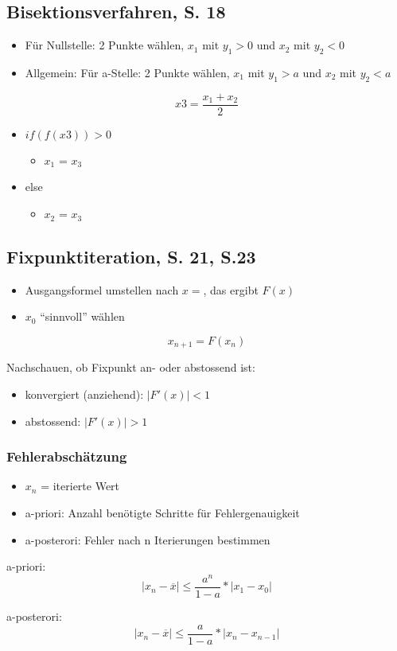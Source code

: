 \subsection{Bisektionsverfahren, S. 18}

\begin{itemize}
\item Für Nullstelle: 2 Punkte wählen, $x_1$ mit $y_1 > 0$ und $x_2$ mit $y_2 < 0$
\item Allgemein: Für a-Stelle: 2 Punkte wählen, $x_1$ mit $y_1 > a$ und $x_2$ mit $y_2 < a$
\end{itemize}
\[x3 = \frac{x_1 + x_2}{2}\]

\begin{itemize}
\item $if(f(x3)) > 0$
\begin{itemize}
\item $x_1$ = $x_3$
\end{itemize}
\item else
\begin{itemize}
\item $x_2$ = $x_3$
\end{itemize}
\end{itemize}

\subsection{Fixpunktiteration, S. 21, S.23}
\begin{itemize}
\item Ausgangsformel umstellen nach $x = $, das ergibt $F(x)$
\item $x_0$ "`sinnvoll"' wählen
\end{itemize}
\[x_{n+1} = F(x_n)\]

Nachschauen, ob Fixpunkt an- oder abstossend ist:
\begin{itemize}
\item konvergiert (anziehend): $|F'(x)| < 1$
\item abstossend: $|F'(x)| > 1$
\end{itemize}


\subsubsection{Fehlerabschätzung}

\begin{itemize}
\item $x_n$ = iterierte Wert
\item a-priori: Anzahl benötigte Schritte für Fehlergenauigkeit
\item a-posterori: Fehler nach n Iterierungen bestimmen
\end{itemize}

a-priori:
\[|x_n - \overline{x}| \leq{} \frac{a^n}{1 - a} * |x_1 - x_0|\]

a-posterori:
\[|x_n - \overline{x}| \leq{} \frac{a}{1 - a} * |x_n - x_{n-1}|\]
